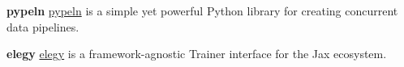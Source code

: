 \begin{cventries}
  \cventry
    {\textbf{pypeln}}
    {}
    {}
    {}
    {
      \href{https://github.com/cgarciae/pypeln}{pypeln} is a simple yet powerful Python library for creating concurrent data pipelines.
    }

  \cventry
    {\textbf{elegy}}
    {}
    {}
    {}
    {
      \href{https://github.com/poets-ai/elegy}{elegy}  is a framework-agnostic Trainer interface for the Jax ecosystem.
    }

\end{cventries}
